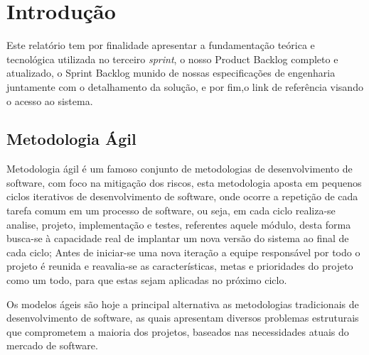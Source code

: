 \documentclass{abnt}
\begin{document}





\capa

\folhaderosto

\tableofcontents

\listoffigures


\chapter{Introdução}

	Este relatório tem por finalidade apresentar a fundamentação teórica e tecnológica utilizada no terceiro \emph{sprint}, o nosso Product Backlog completo e atualizado, 
	o Sprint Backlog munido de nossas especificações de engenharia juntamente com o detalhamento da solução, e por fim,o link de referência visando o acesso ao sistema.

	\section{Metodologia Ágil}
	
		Metodologia ágil é um famoso conjunto de metodologias de desenvolvimento de software, 
		com foco na mitigação dos riscos, esta metodologia aposta em pequenos ciclos iterativos de desenvolvimento de software,
		onde ocorre a repetição de cada tarefa comum em um processo de software, ou seja, em cada ciclo realiza-se analise, projeto,
		implementação e testes, referentes aquele módulo, desta forma busca-se à capacidade real de implantar um nova versão 
		do sistema ao final de cada ciclo; Antes de iniciar-se uma nova iteração a equipe responsável por todo o projeto é reunida 
		e reavalia-se as características, metas e prioridades do projeto como um todo, para que estas sejam aplicadas no próximo ciclo.
		
		Os modelos ágeis são hoje a principal alternativa as metodologias tradicionais de desenvolvimento de software, 
		as quais apresentam diversos problemas estruturais que comprometem a maioria dos projetos, 
		baseados nas necessidades atuais do mercado de software.
	
\end{document}
